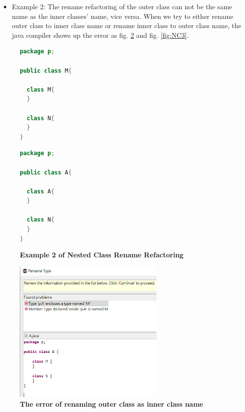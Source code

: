 \begin{itemize}
\item Example 2: The rename refactoring of the outer class can not be the same name as the inner classes' name, vice versa. When we try to either rename outer class to inner class name or rename inner class to outer class name, the java compiler shows up the error as fig. \ref{fig:NC2} and fig. \ref{fig:NC3}.
\end{itemize}

\begin{figure}[th]
\centering
\begin{minipage}[t]{0.45\linewidth}
\begin{lstlisting}[language=java, basicstyle=\scriptsize\ttfamily,frame=single]
package p;

public class M{	
  
  class M{
  }
	
  class N{
  }
} 
\end{lstlisting}
\end{minipage}
\hfill
\begin{minipage}[t]{0.45\linewidth}
\begin{lstlisting}[language=java, basicstyle=\scriptsize\ttfamily,frame=single]
package p;

public class A{	
    
  class A{
  }
    
  class N{
  }
} 
\end{lstlisting}
\end{minipage}
\caption{\textbf{Example 2 of Nested Class Rename Refactoring}}
\label{fig:nestedclass2}
\end{figure}

\begin{figure}[H]
\centerline{\includegraphics[width=75mm,scale=0.4]{NC2.jpg}}
\caption{\textbf{The error of renaming outer class as inner class name}}
\label{fig:NC2}
\end{figure}

